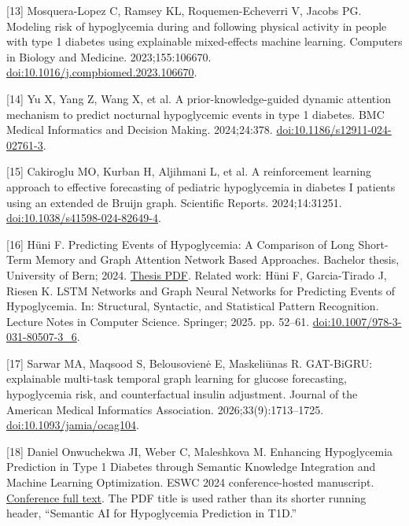 \documentclass[11pt,a4paper]{article}
\begin{document}
[13] Mosquera-Lopez C, Ramsey KL, Roquemen-Echeverri V, Jacobs PG. Modeling risk of hypoglycemia during and following physical activity in people with type 1 diabetes using explainable mixed-effects machine learning. Computers in Biology and Medicine. 2023;155:106670. \href{https://doi.org/10.1016/j.compbiomed.2023.106670}{doi:10.1016/j.compbiomed.2023.106670}.

[14] Yu X, Yang Z, Wang X, et al. A prior-knowledge-guided dynamic attention mechanism to predict nocturnal hypoglycemic events in type 1 diabetes. BMC Medical Informatics and Decision Making. 2024;24:378. \href{https://doi.org/10.1186/s12911-024-02761-3}{doi:10.1186/s12911-024-02761-3}.

[15] Cakiroglu MO, Kurban H, Aljihmani L, et al. A reinforcement learning approach to effective forecasting of pediatric hypoglycemia in diabetes I patients using an extended de Bruijn graph. Scientific Reports. 2024;14:31251. \href{https://doi.org/10.1038/s41598-024-82649-4}{doi:10.1038/s41598-024-82649-4}.

[16] Hüni F. Predicting Events of Hypoglycemia: A Comparison of Long Short-Term Memory and Graph Attention Network Based Approaches. Bachelor thesis, University of Bern; 2024. \href{https://prg.inf.unibe.ch/wp-content/uploads/2024/08/BA_FabianHuni.pdf}{Thesis PDF}. Related work: Hüni F, Garcia-Tirado J, Riesen K. LSTM Networks and Graph Neural Networks for Predicting Events of Hypoglycemia. In: Structural, Syntactic, and Statistical Pattern Recognition. Lecture Notes in Computer Science. Springer; 2025. pp. 52--61. \href{https://doi.org/10.1007/978-3-031-80507-3_6}{doi:10.1007/978-3-031-80507-3\_\allowbreak{}6}.

[17] Sarwar MA, Maqsood S, Belousovienė E, Maskeliūnas R. GAT-BiGRU: explainable multi-task temporal graph learning for glucose forecasting, hypoglycemia risk, and counterfactual insulin adjustment. Journal of the American Medical Informatics Association. 2026;33(9):1713--1725. \href{https://doi.org/10.1093/jamia/ocag104}{doi:10.1093/jamia/ocag104}.

[18] Daniel Onwuchekwa JI, Weber C, Maleshkova M. Enhancing Hypoglycemia Prediction in Type 1 Diabetes through Semantic Knowledge Integration and Machine Learning Optimization. ESWC 2024 conference-hosted manuscript. \href{https://2024.eswc-conferences.org/wp-content/uploads/2024/05/77770363.pdf}{Conference full text}. The PDF title is used rather than its shorter running header, “Semantic AI for Hypoglycemia Prediction in T1D.”
\end{document}
